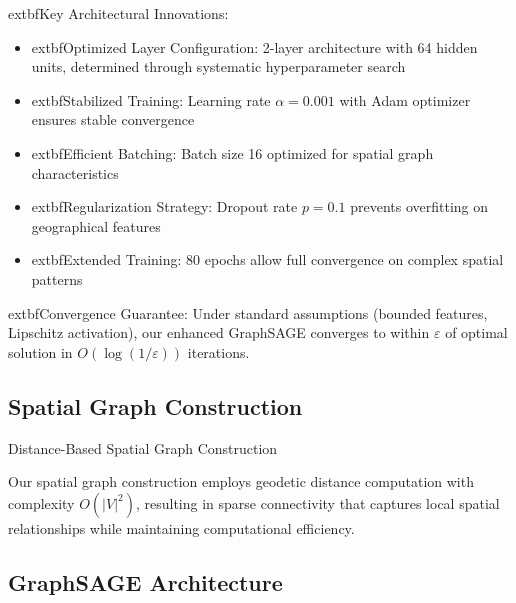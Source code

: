 \documentclass[twocolumn,11pt]{IEEEtran}  %
\begin{document}
	extbf{Key Architectural Innovations:}
\begin{itemize}
\item 	extbf{Optimized Layer Configuration:} 2-layer architecture with 64 hidden units, determined through systematic hyperparameter search
\item 	extbf{Stabilized Training:} Learning rate $\alpha = 0.001$ with Adam optimizer ensures stable convergence
\item 	extbf{Efficient Batching:} Batch size 16 optimized for spatial graph characteristics
\item 	extbf{Regularization Strategy:} Dropout rate $p = 0.1$ prevents overfitting on geographical features
\item 	extbf{Extended Training:} 80 epochs allow full convergence on complex spatial patterns
\end{itemize}

	extbf{Convergence Guarantee:} Under standard assumptions (bounded features, Lipschitz activation), our enhanced GraphSAGE converges to within $\varepsilon$ of optimal solution in $O(\log(1/\varepsilon))$ iterations.

\subsection{Spatial Graph Construction}

\begin{algorithm}
\caption{Distance-Based Spatial Graph Construction}
\label{alg:graph_construction}
\begin{algorithmic}[1]
        \ENDIF
    \ENDFOR
\ENDFOR
{}
\end{algorithmic}
\end{algorithm}

Our spatial graph construction employs geodetic distance computation with complexity $O(|V|^2)$, resulting in sparse connectivity that captures local spatial relationships while maintaining computational efficiency.

\subsection{GraphSAGE Architecture}
\end{document}
